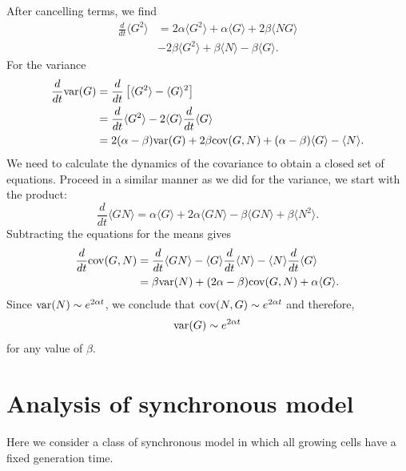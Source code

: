 \documentclass{article}
\begin{document}
After cancelling terms, we find
\begin{align}
\frac{d}{dt}\langle  G^2\rangle  &= 2 \alpha \langle G^2 \rangle  + \alpha \langle G \rangle + 2 \beta \langle N G \rangle \\
&- 2 \beta \langle G^2 \rangle  + \beta \langle N \rangle  - \beta \langle G\rangle. 
\end{align}
For the variance 
\begin{align}
\frac{d}{dt}{\rm var}(G) &= \frac{d}{dt} \left[\langle G^2 \rangle - \langle G \rangle^2 \right]\\
&= \frac{d}{dt} \langle G^2 \rangle  - 2\langle G \rangle \frac{d}{dt} \langle G \rangle\\
&= 2 (\alpha - \beta){\rm var}(G) + 2 \beta {\rm cov}(G,N) + (\alpha-\beta)\langle G \rangle  - \langle  N\rangle. 
\end{align} 
We need to calculate the dynamics of the covariance to obtain a closed set of equations. Proceed in a similar manner as we did for the variance, we start with the product:
\begin{equation}
\frac{d}{dt}\langle G N \rangle  = \alpha \langle  G\rangle  + 2\alpha \langle G N \rangle  - \beta \langle G N \rangle  + \beta \langle N^2 \rangle. 
\end{equation}
Subtracting the equations for the means gives 
\begin{align}
\frac{d}{dt} {\rm cov}(G,N) &= \frac{d}{dt}\langle G N\rangle  - \langle G  \rangle \frac{d}{dt}\langle  N\rangle  -  \langle N  \rangle \frac{d}{dt}\langle  G\rangle\\
&= \beta {\rm var}(N) + (2\alpha - \beta){\rm cov}(G,N) + \alpha \langle G \rangle. 
\end{align}
Since ${\rm var}(N) \sim e^{2 \alpha t}$, we conclude that ${\rm cov}(N,G) \sim e^{2\alpha t}$ and therefore,  
\begin{equation}
{\rm var}(G) \sim e^{2\alpha t}
\end{equation}
for any value of $\beta$. 

\section{Analysis of synchronous model}\label{app:sync}
Here we consider a class of synchronous model in which all growing cells have a fixed generation time.  
\end{document}
